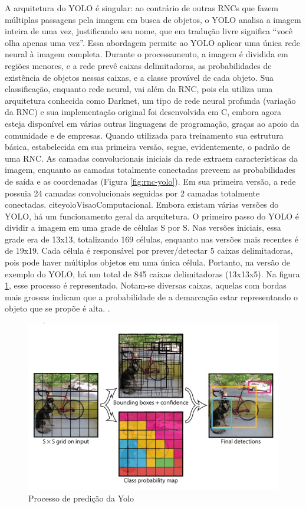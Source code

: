 A arquitetura do YOLO é singular: ao contrário de outras RNCs que fazem múltiplas passagens pela imagem em busca de objetos, o YOLO analisa a imagem inteira de uma vez, justificando seu nome, que em tradução livre significa “você olha apenas uma vez”. Essa abordagem permite ao YOLO aplicar uma única rede neural à imagem completa. Durante o processamento, a imagem é dividida em regiões menores, e a rede prevê caixas delimitadoras, as probabilidades de existência de objetos nessas caixas, e a classe provável de cada objeto. Sua classificação, enquanto rede neural, vai além da RNC, pois ela utiliza uma arquitetura conhecida como Darknet, um tipo de rede neural profunda (variação da RNC) e sua implementação original foi desenvolvida em C, embora agora esteja disponível em várias outras linguagens de programação, graças ao apoio da comunidade e de empresas. Quando utilizada para treinamento sua estrutura básica, estabelecida em sua primeira versão, segue, evidentemente, o padrão de uma RNC. As camadas convolucionais iniciais da rede extraem características da imagem, enquanto as camadas totalmente conectadas preveem as probabilidades de saída e as coordenadas (Figura \ref{fig:rnc-yolo}). Em sua primeira versão, a rede possuia 24 camadas convolucionais seguidas por 2 camadas totalmente conectadas. cite{yoloVisaoComputacional}.
Embora existam várias versões do YOLO, há um funcionamento geral da arquitetura. O primeiro passo do YOLO é dividir a imagem em uma grade de células S por S. Nas versões iniciais, essa grade era de 13x13, totalizando 169 células, enquanto nas versões mais recentes é de 19x19. Cada célula é responsável por prever/detectar 5 caixas delimitadoras, pois pode haver múltiplos objetos em uma única célula. Portanto, na versão de exemplo do YOLO, há um total de 845 caixas delimitadoras (13x13x5). Na figura \ref{fig:yolo}, esse processo é representado. Notam-se diversas caixas, aquelas com bordas mais grossas indicam que a probabilidade de a demarcação estar representando o objeto que se propõe é alta. \cite{jiang2022review}.

\begin{figure}[!h]
    \center
    \begin{minipage}{0.9\linewidth}
    \center
    \captionsetup{justification=centering,margin=0.5cm,font=small}
    \includegraphics[width=0.7\linewidth]{img/cap2/processo-predicao-YOLO.jpeg}
    \caption{ Processo de predição da Yolo \cite{redmon2016youlookonce}} \label{fig:yolo}
    \end{minipage}
\end{figure}


